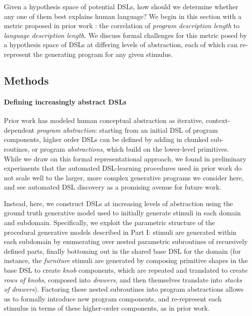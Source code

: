 \documentclass[10pt,letterpaper]{article}
\begin{document}
Given a hypothesis space of potential DSLs, how should we determine whether any one of them best explains human language? We begin in this section with a metric proposed in prior work \cite{sun2021seeing}: the correlation of \textit{program description length} to \textit{language description length}. We discuss formal challenges for this metric posed by a hypothesis space of DSLs at differing levels of abstraction, each of which can re-represent the generating program for any given stimulus.

\subsection{Methods}
\paragraph{Defining increasingly abstract DSLs} Prior work  has modeled human conceptual abstraction as iterative, context-dependent \textit{program abstraction}: starting from an initial DSL of program components, higher order DSLs can be defined by adding in chunked sub-routines, or program \textit{abstractions}, which build on the lower-level primitives. While we draw on this formal representational approach, we found in preliminary experiments that the automated DSL-learning procedures used in prior work do not scale well to the larger, more complex generative programs we consider here, and see automated DSL discovery as a promising avenue for future work.

Instead, here, we construct DSLs at increasing levels of abstraction using the ground truth generative model used to initially generate stimuli in each domain and subdomain. Specifically, we exploit the parametric structure of the procedural generative models described in Part I: stimuli are generated within each subdomain by enumerating over nested parametric subroutines of recursively defined parts, finally bottoming out in the shared base DSL for the domain (for instance, the \textit{furniture} stimuli are generated by composing primitive shapes in the base DSL to create \textit{knob} components, which are repeated and translated to create \textit{rows of knobs}, composed into \textit{drawers}, and then themselves translate into \textit{stacks of drawers}). Factoring these nested subroutines into program abstractions allows us to formally introduce new program components, and re-represent each stimulus in terms of these higher-order components, as in prior work.
\end{document}
